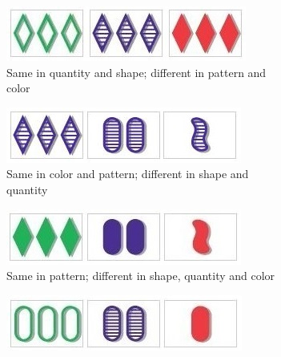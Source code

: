 \begin{problem}
\begin{figure}[H] %
\captionsetup[subfigure]{justification=centering}
\centering
\begin{subfigure}{.47\textwidth}
    \centering
    \includegraphics[width=\linewidth]{figures/set1.jpg}
    \caption{Same in quantity and shape; different in pattern and color}
    \label{fig:labelthefirstfigure}
\end{subfigure}
\begin{subfigure}{.47\textwidth}
    \centering
    \includegraphics[width=\linewidth]{figures/set6.jpg}
    \caption{Same in color and pattern; different in shape and quantity}
    \label{fig:labelthefirstfigure}
\end{subfigure}
\begin{subfigure}{.47\textwidth}
    \centering
    \includegraphics[width=\linewidth]{figures/set2.jpg}
    \caption{Same in pattern; different in shape, quantity and color}
    \label{fig:labeltheotherfigure}
\end{subfigure}%
\begin{subfigure}{.47\textwidth}
    \centering
    \includegraphics[width=\linewidth]{figures/set3.jpg}

\end{subfigure}
\end{figure}
\end{problem}
